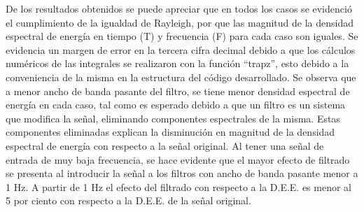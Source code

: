 De los resultados obtenidos se puede apreciar que en todos los casos se evidenció el cumplimiento de la igualdad de Rayleigh, por que las magnitud de la densidad espectral de energía en tiempo (T) y frecuencia (F) para cada caso son iguales. Se evidencia un margen de error en la tercera cifra decimal debido a que los cálculos numéricos de las integrales se realizaron con la función ``trapz'', esto debido a la conveniencia de la misma en la estructura del código desarrollado.
Se observa que a menor ancho de banda pasante del filtro, se tiene menor densidad espectral de energía en cada caso, tal como es esperado debido a que un filtro es un sistema que modifica la señal, eliminando componentes espectrales de la misma. Estas componentes eliminadas explican la disminución en magnitud de la densidad espectral de energía con respecto a la señal original.
Al tener una señal de entrada de muy baja frecuencia, se hace evidente que el mayor efecto de filtrado se presenta al introducir la señal a los filtros con ancho de banda pasante menor a 1 Hz. A partir de 1 Hz el efecto del filtrado con respecto a la D.E.E. es menor al 5 por ciento con respecto a la D.E.E. de la señal original.

